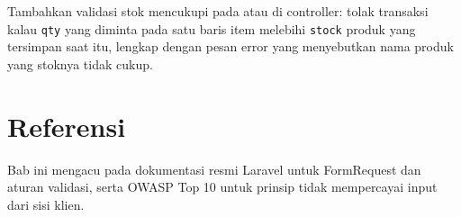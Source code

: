 \begin{challengebox}
Tambahkan validasi stok mencukupi pada 
atau di controller: tolak transaksi kalau \texttt{qty} yang diminta pada
satu baris item melebihi \texttt{stock} produk yang tersimpan saat itu,
lengkap dengan pesan error yang menyebutkan nama produk yang stoknya
tidak cukup.
\end{challengebox}

\section{Referensi}

Bab ini mengacu pada dokumentasi resmi Laravel \cite{laraveldocs} untuk
FormRequest dan aturan validasi, serta OWASP Top 10 \cite{owasptop10}
untuk prinsip tidak mempercayai input dari sisi klien.
